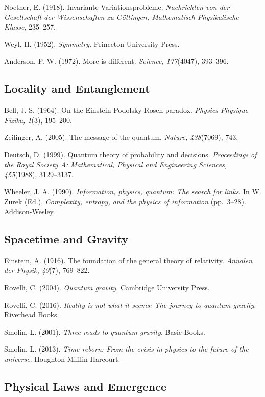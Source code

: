 \documentclass[
  openright]{book}
\begin{document}
Noether, E. (1918). Invariante Variationsprobleme. \emph{Nachrichten von
der Gesellschaft der Wissenschaften zu Göttingen,
Mathematisch-Physikalische Klasse}, 235--257.

Weyl, H. (1952). \emph{Symmetry}. Princeton University Press.

Anderson, P. W. (1972). More is different. \emph{Science, 177}(4047),
393--396.

\subsection{Locality and Entanglement}\label{locality-and-entanglement}

Bell, J. S. (1964). On the Einstein Podolsky Rosen paradox.
\emph{Physics Physique Fizika, 1}(3), 195--200.

Zeilinger, A. (2005). The message of the quantum. \emph{Nature,
438}(7069), 743.

Deutsch, D. (1999). Quantum theory of probability and decisions.
\emph{Proceedings of the Royal Society A: Mathematical, Physical and
Engineering Sciences, 455}(1988), 3129--3137.

Wheeler, J. A. (1990). \emph{Information, physics, quantum: The search
for links}. In W. Zurek (Ed.), \emph{Complexity, entropy, and the
physics of information} (pp.~3--28). Addison-Wesley.

\subsection{Spacetime and Gravity}\label{spacetime-and-gravity}

Einstein, A. (1916). The foundation of the general theory of relativity.
\emph{Annalen der Physik, 49}(7), 769--822.

Rovelli, C. (2004). \emph{Quantum gravity}. Cambridge University Press.

Rovelli, C. (2016). \emph{Reality is not what it seems: The journey to
quantum gravity}. Riverhead Books.

Smolin, L. (2001). \emph{Three roads to quantum gravity}. Basic Books.

Smolin, L. (2013). \emph{Time reborn: From the crisis in physics to the
future of the universe}. Houghton Mifflin Harcourt.

\subsection{Physical Laws and
Emergence}\label{physical-laws-and-emergence}
\end{document}

